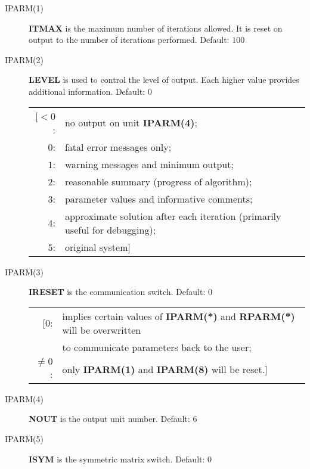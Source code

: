 \begin{description}
 
 \item[IPARM(1)] {\bf ITMAX} is the maximum number of iterations 
                 allowed.  It is reset on output to the number of 
                 iterations performed. Default: $100$
 
 \item[IPARM(2)] {\bf LEVEL} is used to control the level of output.
                 Each higher value provides additional information.
                 Default: $0$

                 \begin{tabular}{rl} 
                 [$<0$: & no output on unit {\bf IPARM(4)}; \\
                   $0$: & fatal error messages only; \\
                   $1$: & warning messages and minimum output; \\
                   $2$: & reasonable summary (progress of algorithm); \\
                   $3$: & parameter values and informative comments; \\
                   $4$: & approximate solution after each iteration 
                          (primarily useful for debugging); \\
                   $5$: & original system] 
                 \end{tabular} 
  
 \item[IPARM(3)] {\bf IRESET} is the communication switch.  Default: $0$

                 \begin{tabular}{rl} 
                 [$0$: & implies certain values of {\bf IPARM(*)} and 
                         {\bf RPARM(*)} will be overwritten \\
                       & to communicate parameters back to the user; \\
             $\neq 0$: & only {\bf IPARM(1)} and {\bf IPARM(8)} 
                         will be reset.]
                 \end{tabular} 
 
 \item[IPARM(4)] {\bf NOUT} is the output unit number. Default: $6$
 
 \item[IPARM(5)] {\bf ISYM} is the symmetric matrix switch. 
                 Default: $0$


\end{description}
